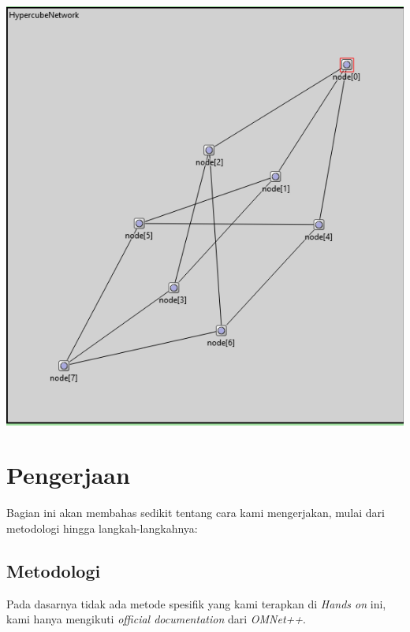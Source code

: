 \documentclass[conference]{IEEEtran}
\begin{document}
\includegraphics[scale=0.5]{images/algoritma-dijkstra.png}

\section{Pengerjaan}\label{pengerjaan}
Bagian ini akan membahas sedikit tentang cara kami mengerjakan, mulai dari metodologi hingga langkah-langkahnya:

\subsection{Metodologi}
Pada dasarnya tidak ada metode spesifik yang kami terapkan di \textit{Hands on} ini, kami hanya mengikuti \textit{official documentation} dari \textit{OMNet++}.
\end{document}
